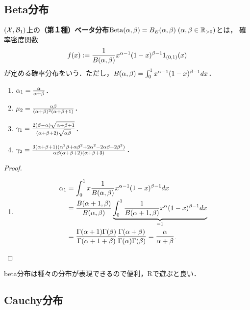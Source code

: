 \documentclass[uplatex,dvipdfmx]{jsreport}
\begin{document}
\subsection{Beta分布}

\begin{definition}
    $(\mathcal{X},\mathcal{B}_1)$上の\textbf{（第１種）ベータ分布}$\mathrm{Beta}(\alpha,\beta)=B_E(\alpha,\beta)\;(\alpha,\beta\in\mathbb{R}_{>0})$とは，
    確率密度関数
    \[f(x):=\frac{1}{B(\alpha,\beta)}x^{\alpha-1}(1-x)^{\beta-1}1_{(0,1)}(x)\]
    が定める確率分布をいう．ただし，$B(\alpha,\beta)=\int^1_0x^{\alpha-1}(1-x)^{\beta-1}dx$．
\end{definition}

\begin{proposition}\mbox{}
    \begin{enumerate}
        \item $\alpha_1=\frac{\alpha}{\alpha+\beta}$．
        \item $\mu_2=\frac{\alpha\beta}{(\alpha+\beta)^2(\alpha+\beta+1)}$．
        \item $\gamma_1=\frac{2(\beta-\alpha)\sqrt{\alpha+\beta+1}}{(\alpha+\beta+2)\sqrt{\alpha\beta}}$．
        \item $\gamma_2=\frac{3(\alpha+\beta+1)(\alpha^2\beta+\alpha\beta^2+2\alpha^2-2\alpha\beta+2\beta^2)}{\alpha\beta(\alpha+\beta+2)(\alpha+\beta+3)}$．
    \end{enumerate}
\end{proposition}
\begin{proof}\mbox{}
    \begin{enumerate}
        \item \begin{align*}
            \alpha_1&=\int^1_0x\frac{1}{B(\alpha,\beta)}x^{\alpha-1}(1-x)^{\beta-1}dx\\
            &=\frac{B(\alpha+1,\beta)}{B(\alpha,\beta)}\underbrace{\int^1_0\frac{1}{B(\alpha+1,\beta)}x^\alpha(1-x)^{\beta-1}dx}_{=1}\\
            &=\frac{\Gamma(\alpha+1)\Gamma(\beta)}{\Gamma(\alpha+1+\beta)}\frac{\Gamma(\alpha+\beta)}{\Gamma(\alpha)\Gamma(\beta)}=\frac{\alpha}{\alpha+\beta}.
        \end{align*}
    \end{enumerate}
\end{proof}

\begin{remark}
    beta分布は種々の分布が表現できるので便利，Rで遊ぶと良い．
\end{remark}

\subsection{Cauchy分布}
\end{document}
